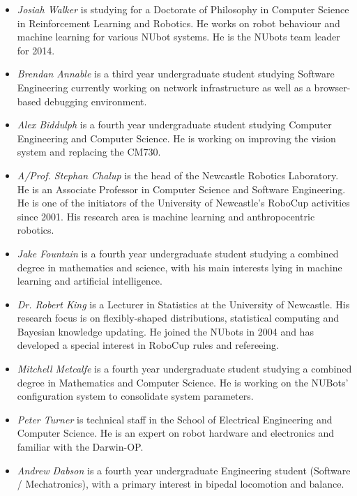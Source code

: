 \documentclass{llncs}
\begin{document}
\begin{itemize}
\item \emph{Josiah Walker} is studying for a Doctorate of Philosophy in Computer Science in Reinforcement Learning and Robotics. He works on robot behaviour and machine learning for various NUbot systems. He is the NUbots team leader for 2014.




\item \emph{Brendan Annable} is a third year undergraduate student studying Software Engineering currently working on network infrastructure as well as a browser-based debugging environment.

\item \emph{Alex Biddulph} is a fourth year undergraduate student studying Computer Engineering and Computer Science. He is working on improving the vision system and replacing the CM730.

\item \emph{A/Prof. Stephan Chalup} is the head of the Newcastle Robotics
Laboratory. He is an Associate Professor in Computer Science and Software Engineering.
He is one of the initiators of the University of Newcastle's
RoboCup activities since 2001. His research area is machine learning
and anthropocentric robotics.

\item \emph{Jake Fountain} is a fourth year undergraduate student studying a combined degree in mathematics and science, with his main interests lying in machine learning and artificial intelligence.

\item \emph{Dr. Robert King} is a Lecturer in Statistics at the University of Newcastle. His research focus is on flexibly-shaped distributions,
statistical computing and Bayesian knowledge updating. He joined the
NUbots in 2004 and has developed a special interest in RoboCup rules and refereeing.

\item \emph{Mitchell Metcalfe} is a fourth year undergraduate student studying a combined degree in Mathematics and Computer Science. He is working on the NUBots' configuration system to consolidate system parameters.

\item \emph{Peter Turner} is technical staff in the School of Electrical Engineering and Computer Science. He is an expert on robot hardware and electronics and familiar with the Darwin-OP.

\item \emph{Andrew Dabson} is a fourth year undergraduate Engineering student (Software / Mechatronics), with a primary interest in bipedal locomotion and balance.


\end{itemize}
\end{document}
